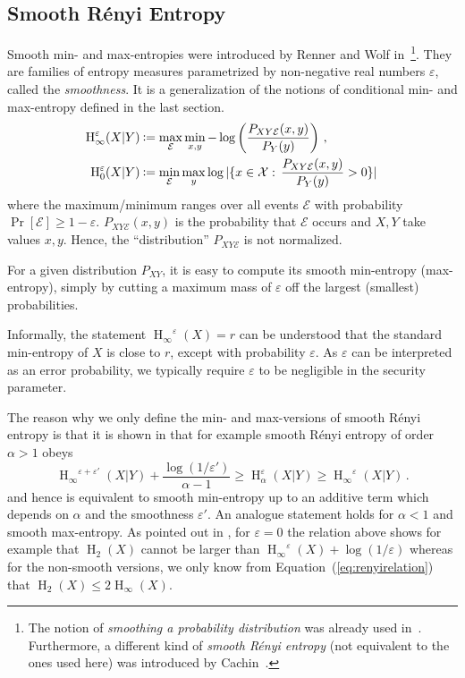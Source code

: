 \documentclass[final,11pt,a4paper]{report}
\newcommand*{\assign}{\ensuremath{\kern.5ex\raisebox{.1ex}{\mbox{\rm:}}\kern -.3em =}}
\newcommand*{\cX}{\mathcal{X}}
\newcommand*{\Set}[2]{\{#1:\,#2\}}     %
\renewcommand*{\H}{\operatorname{H}}   %
\newcommand*{\hmin}{\ensuremath{\H_{\infty}}}
\newcommand*{\hmax}{\ensuremath{\H_{0}}}
\newcommand*{\hie}[2]{\ensuremath{\hmin^{#1}(#2)}}
\newcommand*{\hiee}[1]{\hie{\varepsilon}{#1}}
\newcommand*{\hmaxe}[2]{\ensuremath{\hmax^{#1}(#2)}}
\newcommand*{\hmaxee}[1]{\hmaxe{\varepsilon}{#1}}
\newcommand*{\eps}{\varepsilon}
\newcommand*{\ev}{\ensuremath{\mathcal{E}}\xspace} %
\begin{document}
\subsection{Smooth R\'enyi Entropy} \label{sec:defsmoothrenyientropy}
Smooth min- and max-entropies were introduced by Renner and Wolf in~\cite{Renner05,RW05}\footnote{The notion of \emph{smoothing a
    probability distribution} was already used in~\cite{ILL89}.
  Furthermore, a different kind of \emph{smooth R\'enyi entropy} (not
  equivalent to the ones used here) was introduced by Cachin~\cite{Cachin97}.}. They are families of entropy measures
parametrized by non-negative real numbers $\varepsilon$, called the
{\em smoothness}. It is a generalization of the notions of
conditional min- and max-entropy defined in the last section.
\begin{align*}
\hiee{X|Y} &\assign \max_{\ev} \min_{x,y} - \log
\left(\frac{P_{XY\ev}(x,y)}{P_Y(y)} \right) \, ,\\
\hmaxee{X|Y} &\assign \min_{\ev} \max_{y} \log
|\Set{x \in \cX}{\frac{P_{XY\ev}(x,y)}{P_Y(y)} > 0}| \,
\end{align*}
where the maximum/minimum ranges over all events $\ev$ with
probability $\Pr[\ev] \geq 1-\eps$.  $P_{XY\ev}(x,y)$ is the
probability that $\ev$ occurs and $X,Y$ take values $x,y$. Hence, the
``distribution'' $P_{XY\ev}$ is not normalized.

For a given distribution $P_{XY}$, it is easy to compute its smooth
min-entropy (max-entropy), simply by cutting a maximum mass of
$\eps$ off the largest (smallest) probabilities.

Informally, the statement $\hiee{X} = r$ can be understood that the
standard min-entropy of $X$ is close to $r$, except with probability
$\varepsilon$. As $\varepsilon$ can be interpreted as an error
probability, we typically require $\varepsilon$ to be negligible in
the security parameter. 

The reason why we only define the min- and max-versions of smooth
R\'enyi entropy is that it is shown in \cite{RW05} that for example
smooth R\'enyi entropy of order $\alpha>1$ obeys
\[ \hie{\eps+\eps'}{X|Y} + \frac{\log(1/\eps')}{\alpha-1} \geq
\H_{\alpha}^{\eps}(X|Y) \geq \hiee{X|Y} \, .
\]
and hence is equivalent to smooth min-entropy up to an additive term
which depends on $\alpha$ and the smoothness $\eps'$. An analogue
statement holds for $\alpha<1$ and smooth max-entropy. As pointed out
in \cite{RW05}, for $\eps=0$ the relation above shows for example that
$\H_2(X)$ cannot be larger than $\hiee{X} + \log(1/\eps)$ whereas for
the non-smooth versions, we only know from
Equation~(\ref{eq:renyirelation}) that $\H_2(X) \leq 2 \hmin(X)$.
\end{document}
